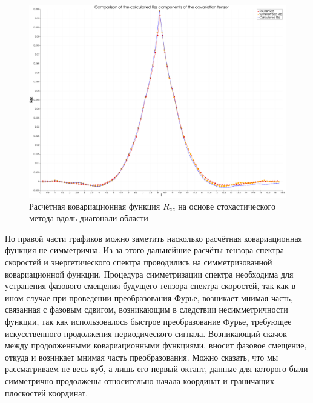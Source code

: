 \begin{figure}[ht] 
  \center
  \includegraphics [width=0.8\linewidth] {images/kriging/3components/diagonal_r33_zz.png}
  \caption{Расчётная ковариационная функция $R_{zz}$ на основе стохастического метода вдоль диагонали области } 
  \label{img:kriging_covariances_diag}  
\end{figure}

По правой части графиков можно заметить насколько расчётная ковариационная функция не симметрична. Из-за этого дальнейшие расчёты тензора спектра скоростей и энергетического спектра проводились на симметризованной ковариационной функции. Процедура симметризации спектра необходима для устранения фазового смещения будущего тензора спектра скоростей, так как в ином случае при проведении преобразования Фурье, возникает мнимая часть, связанная с фазовым сдвигом, возникающим в следствии несимметричности функции, так как использовалось быстрое преобразование Фурье, требующее искусственного продолжения периодического сигнала. Возникающий скачок между продолженными ковариационными функциями, вносит фазовое смещение, откуда и возникает мнимая часть преобразования. Можно сказать, что мы рассматриваем не весь куб, а лишь его первый октант, данные для которого были симметрично продолжены относительно начала координат и граничащих плоскостей координат. 

